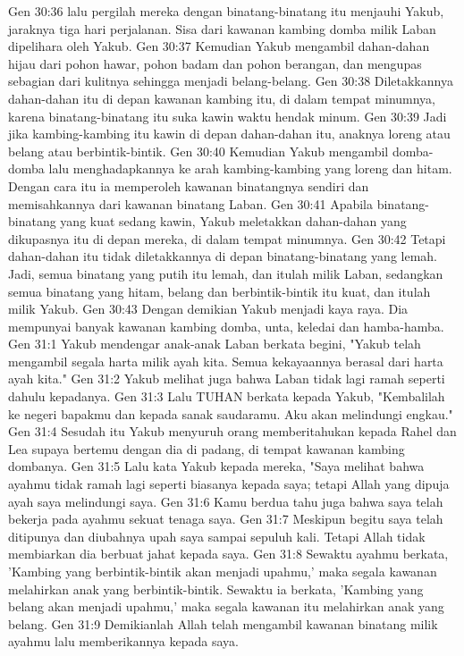 Gen 30:36  lalu pergilah mereka dengan binatang-binatang itu menjauhi Yakub, jaraknya tiga hari perjalanan. Sisa dari kawanan kambing domba milik Laban dipelihara oleh Yakub.
Gen 30:37  Kemudian Yakub mengambil dahan-dahan hijau dari pohon hawar, pohon badam dan pohon berangan, dan mengupas sebagian dari kulitnya sehingga menjadi belang-belang.
Gen 30:38  Diletakkannya dahan-dahan itu di depan kawanan kambing itu, di dalam tempat minumnya, karena binatang-binatang itu suka kawin waktu hendak minum.
Gen 30:39  Jadi jika kambing-kambing itu kawin di depan dahan-dahan itu, anaknya loreng atau belang atau berbintik-bintik.
Gen 30:40  Kemudian Yakub mengambil domba-domba lalu menghadapkannya ke arah kambing-kambing yang loreng dan hitam. Dengan cara itu ia memperoleh kawanan binatangnya sendiri dan memisahkannya dari kawanan binatang Laban.
Gen 30:41  Apabila binatang-binatang yang kuat sedang kawin, Yakub meletakkan dahan-dahan yang dikupasnya itu di depan mereka, di dalam tempat minumnya.
Gen 30:42  Tetapi dahan-dahan itu tidak diletakkannya di depan binatang-binatang yang lemah. Jadi, semua binatang yang putih itu lemah, dan itulah milik Laban, sedangkan semua binatang yang hitam, belang dan berbintik-bintik itu kuat, dan itulah milik Yakub.
Gen 30:43  Dengan demikian Yakub menjadi kaya raya. Dia mempunyai banyak kawanan kambing domba, unta, keledai dan hamba-hamba.
Gen 31:1  Yakub mendengar anak-anak Laban berkata begini, "Yakub telah mengambil segala harta milik ayah kita. Semua kekayaannya berasal dari harta ayah kita."
Gen 31:2  Yakub melihat juga bahwa Laban tidak lagi ramah seperti dahulu kepadanya.
Gen 31:3  Lalu TUHAN berkata kepada Yakub, "Kembalilah ke negeri bapakmu dan kepada sanak saudaramu. Aku akan melindungi engkau."
Gen 31:4  Sesudah itu Yakub menyuruh orang memberitahukan kepada Rahel dan Lea supaya bertemu dengan dia di padang, di tempat kawanan kambing dombanya.
Gen 31:5  Lalu kata Yakub kepada mereka, "Saya melihat bahwa ayahmu tidak ramah lagi seperti biasanya kepada saya; tetapi Allah yang dipuja ayah saya melindungi saya.
Gen 31:6  Kamu berdua tahu juga bahwa saya telah bekerja pada ayahmu sekuat tenaga saya.
Gen 31:7  Meskipun begitu saya telah ditipunya dan diubahnya upah saya sampai sepuluh kali. Tetapi Allah tidak membiarkan dia berbuat jahat kepada saya.
Gen 31:8  Sewaktu ayahmu berkata, 'Kambing yang berbintik-bintik akan menjadi upahmu,' maka segala kawanan melahirkan anak yang berbintik-bintik. Sewaktu ia berkata, 'Kambing yang belang akan menjadi upahmu,' maka segala kawanan itu melahirkan anak yang belang.
Gen 31:9  Demikianlah Allah telah mengambil kawanan binatang milik ayahmu lalu memberikannya kepada saya.
